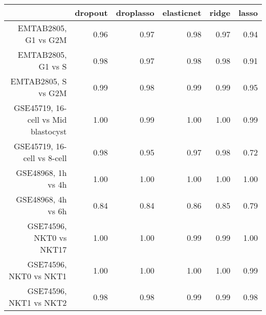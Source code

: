 \begin{table}[ht]
\centering
\begin{tabular}{rrrrrr}
  \hline
 & dropout & droplasso & elasticnet & ridge & lasso \\ 
  \hline
EMTAB2805, G1 vs G2M & 0.96 & 0.97 & 0.98 & 0.97 & 0.94 \\ 
  EMTAB2805, G1 vs S & 0.98 & 0.97 & 0.98 & 0.98 & 0.91 \\ 
  EMTAB2805, S vs G2M & 0.99 & 0.98 & 0.99 & 0.99 & 0.95 \\ 
  GSE45719, 16-cell vs Mid blastocyst & 1.00 & 0.99 & 1.00 & 1.00 & 0.99 \\ 
  GSE45719, 16-cell vs 8-cell & 0.98 & 0.95 & 0.97 & 0.98 & 0.72 \\ 
  GSE48968, 1h vs 4h & 1.00 & 1.00 & 1.00 & 1.00 & 1.00 \\ 
  GSE48968, 4h vs 6h & 0.84 & 0.84 & 0.86 & 0.85 & 0.79 \\ 
  GSE74596, NKT0 vs NKT17 & 1.00 & 1.00 & 0.99 & 0.99 & 1.00 \\ 
  GSE74596, NKT0 vs NKT1 & 1.00 & 1.00 & 1.00 & 1.00 & 0.99 \\ 
  GSE74596, NKT1 vs NKT2 & 0.98 & 0.98 & 0.99 & 0.99 & 0.98 \\ 
   \hline
\end{tabular}
\end{table}
